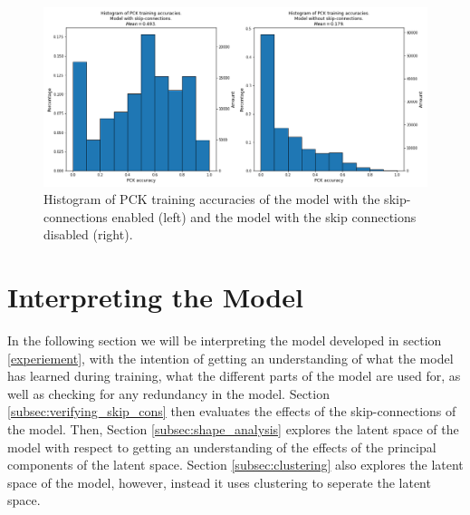 \documentclass[./main.tex]{subfiles}
\begin{document}
\begin{figure}[htbp]
    \centering
    \includegraphics[width = \textwidth]{entities/PCK_accs_vs.png}
    \caption{Histogram of PCK training accuracies of the model with the skip-connections enabled (left) and the model with the skip connections disabled (right).}
    \label{fig:PCK_accs}
\end{figure}

\section{Interpreting the Model}\label{sec:XAI}
In the following section we will be interpreting the model developed in section \ref{experiement}, with the intention of getting an understanding of what the model has learned during training, what the different parts of the model are used for, as well as checking for any redundancy in the model. Section \ref{subsec:verifying_skip_cons} then evaluates the effects of the skip-connections of the model. Then, Section \ref{subsec:shape_analysis} explores the latent space of the model with respect to getting an understanding of the effects of the principal components of the latent space. Section \ref{subsec:clustering} also explores the latent space of the model, however, instead it uses clustering to seperate the latent space.
\end{document}
